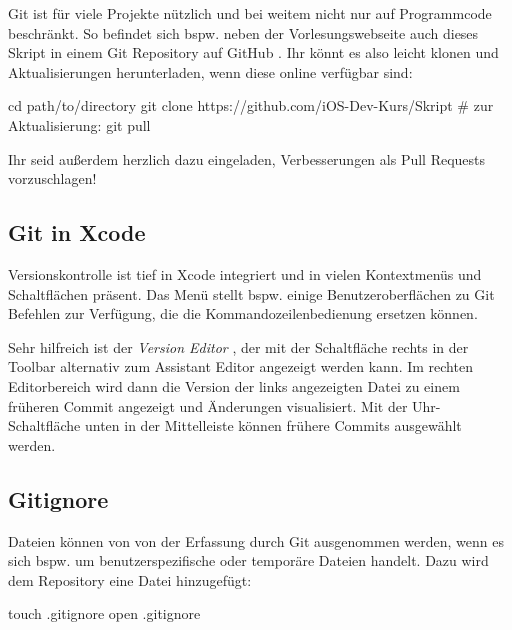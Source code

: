 \documentclass[parskip=half, final]{scrreprt}
\begin{document}
Git ist für viele Projekte nützlich und bei weitem nicht nur auf Programmcode beschränkt. So befindet sich bspw. neben der Vorlesungswebseite auch dieses Skript in einem Git Repository auf GitHub . Ihr könnt es also leicht klonen und Aktualisierungen herunterladen, wenn diese online verfügbar sind:

\begin{shcode}
cd path/to/directory
git clone https://github.com/iOS-Dev-Kurs/Skript
# zur Aktualisierung:
git pull
\end{shcode}

Ihr seid außerdem herzlich dazu eingeladen, Verbesserungen als Pull Requests vorzuschlagen!


\subsection{Git in Xcode} 

Versionskontrolle ist tief in Xcode integriert und in vielen Kontextmenüs und Schaltflächen präsent. Das Menü  stellt bspw. einige Benutzeroberflächen zu Git Befehlen zur Verfügung, die die Kommandozeilenbedienung ersetzen können.

Sehr hilfreich ist der \emph{Version Editor} , der mit der Schaltfläche rechts in der Toolbar alternativ zum Assistant Editor angezeigt werden kann. Im rechten Editorbereich wird dann die Version der links angezeigten Datei zu einem früheren Commit angezeigt und Änderungen visualisiert. Mit der Uhr-Schaltfläche unten in der Mittelleiste können frühere Commits ausgewählt werden.


\subsection{Gitignore}

Dateien können von von der Erfassung durch Git ausgenommen werden, wenn es sich bspw. um benutzerspezifische oder temporäre Dateien handelt. Dazu wird dem Repository eine  Datei hinzugefügt:

\begin{shcode}
touch .gitignore
open .gitignore
\end{shcode}
\end{document}
